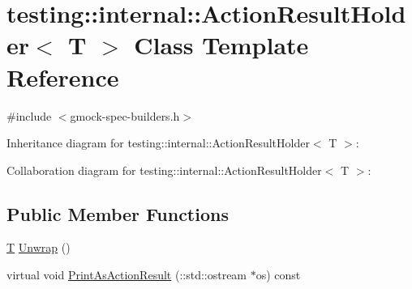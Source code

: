 \hypertarget{classtesting_1_1internal_1_1_action_result_holder}{}\section{testing\+:\+:internal\+:\+:Action\+Result\+Holder$<$ T $>$ Class Template Reference}
\label{classtesting_1_1internal_1_1_action_result_holder}


{\ttfamily \#include $<$gmock-\/spec-\/builders.\+h$>$}



Inheritance diagram for testing\+:\+:internal\+:\+:Action\+Result\+Holder$<$ T $>$\+:


Collaboration diagram for testing\+:\+:internal\+:\+:Action\+Result\+Holder$<$ T $>$\+:
\subsection*{Public Member Functions}
\begin{DoxyCompactItemize}
\item 
\hyperlink{functions__7_8js_adf1f3edb9115acb0a1e04209b7a9937b}{T} \hyperlink{classtesting_1_1internal_1_1_action_result_holder_a057df6cceeeab9ea06e679bcf6b78960}{Unwrap} ()
\item 
virtual void \hyperlink{classtesting_1_1internal_1_1_action_result_holder_a70989192d3ed669c059a7e29c4a7b9fc}{Print\+As\+Action\+Result} (\+::std\+::ostream $\ast$os) const 
\end{DoxyCompactItemize}

